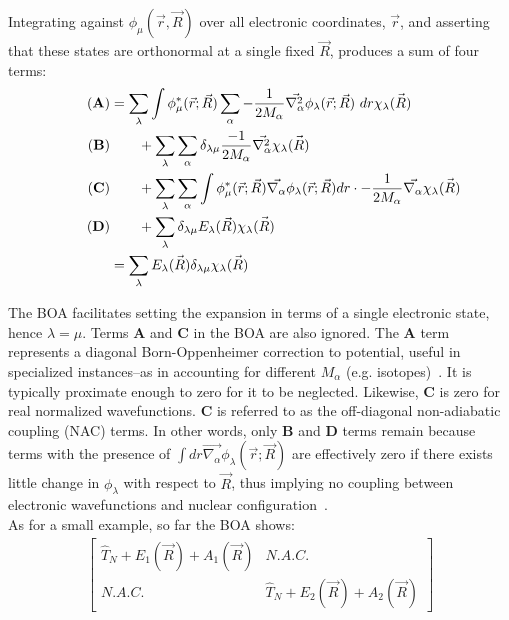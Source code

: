%
Integrating against $\phi_{\mu} (\Vec{r},\Vec{R})$ over all electronic coordinates, $\Vec{r}$, and asserting that these states are orthonormal at a single fixed $\Vec{R}$, produces a sum of four terms:
 \begin{align} 
   \tag{\textbf{A}}\label{eq:A2}
     &= \sum_{\lambda} \int \phi_{\mu}^{*} (\Vec{r};\Vec{R}) \sum_{\alpha} - \frac{1}{2M_{\alpha}} \Vec{\nabla_{\alpha}^{2}} \phi_{\lambda} (\Vec{r};\Vec{R})~dr \chi_{\lambda} \Vec{(R)}
 \\  \tag{\textbf{B}}\label{eq:B2}
     &\qquad+ \sum_{\lambda} \sum_{\alpha} \delta_{\lambda \mu} \frac{-1}{2M_{\alpha}} \Vec{\nabla_{\alpha}^{2}}  \chi_{\lambda} \Vec{(R)}
     \\  \tag{\textbf{C}}\label{eq:C2}
     &\qquad+ \sum_{\lambda} \sum_{\alpha} \int \phi_{\mu}^{*} (\Vec{r};\Vec{R}) \Vec{\nabla_{\alpha}} \phi_{\lambda} (\Vec{r};\Vec{R}) dr \cdot - \frac{1}{2M_{\alpha}} \Vec{\nabla_{\alpha}} \chi_{\lambda} \Vec{(R)}
     \\  \tag{\textbf{D}}\label{eq:D2}
     &\qquad+ \sum_{\lambda} \delta_{\lambda \mu} E_{\lambda} (\Vec{R}) \chi_{\lambda} \Vec{(R)}
     \\ &= \sum_{\lambda} E_{\lambda} \Vec{(R)}  \delta_{\lambda \mu} \chi_{\lambda} \Vec{(R)}
 \end{align}

The BOA facilitates setting the expansion in terms of a single electronic state, hence $\lambda = \mu$. Terms \textbf{A} and \textbf{C} in the BOA are also ignored. The \textbf{A} term represents a diagonal Born-Oppenheimer correction to potential, useful in specialized instances--as in accounting for different $M_{\alpha}$ (e.g. isotopes)~\cite{nooijennotes}. It is typically proximate enough to zero for it to be neglected. Likewise, \textbf{C} is zero for real normalized wavefunctions. \textbf{C} is referred to as the off-diagonal non-adiabatic coupling (NAC) terms. In other words, only \textbf{B} and \textbf{D} terms remain because terms with the presence of $\int dr \Vec{\nabla_{\alpha}} \phi_{\lambda} (\Vec{r};\Vec{R})$ are effectively zero if there exists little change in $\phi_{\lambda}$ with respect to $\Vec{R}$, thus implying no coupling between electronic wavefunctions and nuclear configuration~\cite{nooijennotes}. 
\\
As for a small example, so far the BOA shows:
\begin{equation}%
    \begin{split}
        \begin{bmatrix}
            \hat{T}_N + E_{1}(\Vec{R}) + A_{1}(\Vec{R}) & N.A.C.\\
            N.A.C.& \hat{T}_N + E_{2}{(\Vec{R}) + A_{2}(\Vec{R})}
        \end{bmatrix}
    \end{split}
\end{equation}


